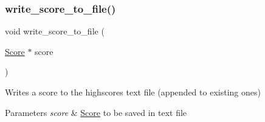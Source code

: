 \subsubsection{\texorpdfstring{write\+\_\+score\+\_\+to\+\_\+file()}{write\_score\_to\_file()}}
{\footnotesize\ttfamily void write\+\_\+score\+\_\+to\+\_\+file (\begin{DoxyParamCaption}\item[{\hyperlink{struct_score}{Score} $\ast$}]{score }\end{DoxyParamCaption})}



Writes a score to the highscores text file (appended to existing ones) 


\begin{DoxyParams}{Parameters}
{\em score} & \hyperlink{struct_score}{Score} to be saved in text file \\
\hline
\end{DoxyParams}
